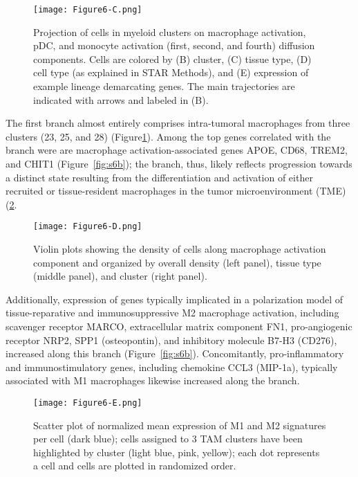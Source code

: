 \begin{figure}
\centering
\texttt{[image: Figure6-C.png]}
\caption{Projection of cells in myeloid clusters on macrophage activation, pDC, and monocyte activation (first, second, and fourth) diffusion components.
  Cells are colored by (B) cluster, (C) tissue type, (D) cell type (as explained in STAR Methods), and (E) expression of example lineage demarcating genes.
  The main trajectories are indicated with arrows and labeled in (B).
}
\label{fig:6c}
\end{figure}

The first branch almost entirely comprises intra-tumoral macrophages from three clusters (23, 25, and 28) (Figure\ref{fig:6c}).
Among the top genes correlated with the branch were are macrophage activation-associated genes APOE, CD68, TREM2, and CHIT1 (Figure~\ref{fig:s6b}); the branch, thus, likely reflects progression towards a distinct state resulting from the differentiation and activation of either recruited or tissue-resident macrophages in the tumor microenvironment (TME) (\ref{fig:6d}. 

\begin{figure}
\centering
\texttt{[image: Figure6-D.png]}
\caption{Violin plots showing the density of cells along macrophage activation component and organized by overall density (left panel), tissue type (middle panel), and cluster (right panel).
}
\label{fig:6d}
\end{figure}

Additionally, expression of genes typically implicated in a polarization model of tissue-reparative and immunosuppressive M2 macrophage activation, including scavenger receptor MARCO, extracellular matrix component FN1, pro-angiogenic receptor NRP2, SPP1 (osteopontin), and inhibitory molecule B7-H3 (CD276), increased along this branch (Figure~\ref{fig:s6b}).
Concomitantly, pro-inflammatory and immunostimulatory genes, including chemokine CCL3 (MIP-1a), typically associated with M1 macrophages likewise increased along the branch.

\begin{figure}
\centering
\texttt{[image: Figure6-E.png]}
\caption{Scatter plot of normalized mean expression of M1 and M2 signatures per cell (dark blue); cells assigned to 3 TAM clusters have been highlighted by cluster (light blue, pink, yellow); each dot represents a cell and cells are plotted in randomized order.
}
\label{fig:6e}
\end{figure}

